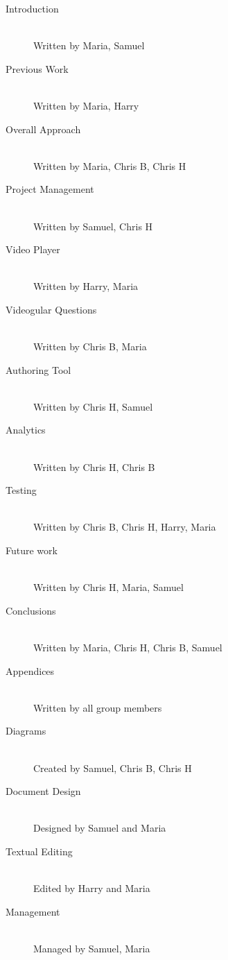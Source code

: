 \begin{description}
\item[Introduction] \hfill \\
	Written by Maria, Samuel
\item[Previous Work] \hfill \\
	Written by Maria, Harry
\item[Overall Approach] \hfill \\
	Written by Maria, Chris B, Chris H
\item[Project Management] \hfill \\
	Written by Samuel, Chris H
\item[Video Player] \hfill \\
	Written by Harry, Maria
\item[Videogular Questions] \hfill \\
	Written by Chris B, Maria
\item[Authoring Tool] \hfill \\
	Written by Chris H, Samuel
\item[Analytics] \hfill \\
	Written by Chris H, Chris B
\item[Testing] \hfill \\
	Written by Chris B, Chris H, Harry, Maria
\item[Future work] \hfill \\
	Written by Chris H, Maria, Samuel
\item[Conclusions] \hfill \\
	Written by Maria, Chris H, Chris B, Samuel
	\\
\item[Appendices] \hfill \\
	Written by all group members
	\\
\item[Diagrams] \hfill \\
	Created by Samuel, Chris B, Chris H
\item[Document Design] \hfill \\
	Designed by Samuel and Maria
\item[Textual Editing] \hfill \\
	Edited by Harry and Maria
\item[Management] \hfill \\
	Managed by Samuel, Maria 
\end{description}


